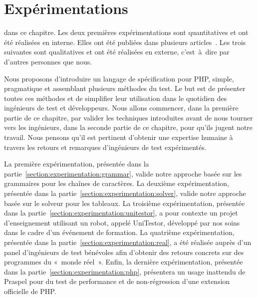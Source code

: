 \chapter{Expérimentations}
\label{chapter:experimentations}

\mminitoc

 dans ce chapitre. Les deux premières expérimentations sont
{\strong quantitatives} et ont été réalisées en interne. Elles ont été publiées
dans plusieurs articles~. Les
trois suivantes sont {\strong qualitatives} et ont été réalisées en externe,
c'est~à~dire par d'autres personnes que nous.

Nous proposons d'introduire un langage de spécification pour PHP, simple,
pragmatique et assemblant plusieurs méthodes du test. Le but est de présenter
toutes ces méthodes et de simplifier leur utilisation dans le quotidien des
ingénieurs de test et développeurs. Nous allons commencer, dans la première
partie de ce chapitre, par valider les techniques introduites avant de nous
tourner vers les ingénieurs, dans la seconde partie de ce chapitre, pour qu'ils
jugent notre travail. Nous pensons qu'il est pertinent d'obtenir une expertise
humaine à travers les retours et remarques d'ingénieurs de test expérimentés.

La première expérimentation, présentée dans la
partie~\ref{section:experimentation:grammar}, valide notre approche basée sur
les grammaires pour les chaînes de caractères. La deuxième expérimentation,
présentée dans la partie~\ref{section:experimentation:solver}, valide notre
approche basée sur le solveur pour les tableaux. La troisième expérimentation,
présentée dans la partie~\ref{section:experimentation:unitestor}, a pour
contexte un projet d'enseignement utilisant un robot, appelé UniTestor,
développé par nos soins dans le cadre d'un événement de formation. La quatrième
expérimentation, présentée dans la partie~\ref{section:experimentation:real}, a
été réalisée auprès d'un panel d'ingénieurs de test bénévoles afin d'obtenir des
retours concrets sur des programmes du «~monde réel~». Enfin, la dernière
expérimentation, présentée dans la partie~\ref{section:experimentation:php},
présentera un usage inattendu de Praspel pour du test de performance et de
non-régression d'une extension officielle de PHP.

